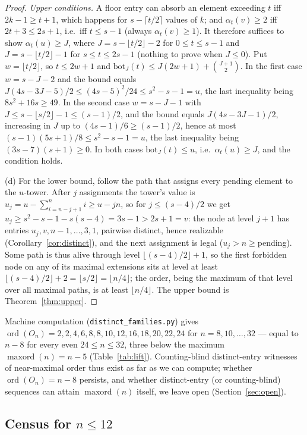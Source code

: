 \documentclass[11pt]{article}
\theoremstyle{definition}
\theoremstyle{remark}
\newcommand{\ord}{\operatorname{ord}}
\newcommand{\maxord}{\operatorname{maxord}}
\begin{document}
\begin{proof}
\emph{Upper conditions.} A floor entry can absorb an element exceeding $t$ iff
$2k-1\ge t+1$, which happens for $s-\lceil t/2\rceil$ values of $k$; and
$\alpha_t(v)\ge2$ iff $2t+3\le2s+1$, i.e.\ iff $t\le s-1$ (always
$\alpha_t(v)\ge1$). It therefore suffices to show $\alpha_t(u)\ge J$, where
$J=s-\lfloor t/2\rfloor-2$ for $0\le t\le s-1$ and $J=s-\lfloor t/2\rfloor-1$ for
$s\le t\le 2s-1$ (nothing to prove when $J\le0$). Put $w=\lfloor t/2\rfloor$, so
$t\le2w+1$ and $\mathrm{bot}_J(t)\le J(2w+1)+\binom{J+1}{2}$. In the first case
$w=s-J-2$ and the bound equals $J(4s-3J-5)/2\le(4s-5)^2/24\le s^2-s-1=u$, the last
inequality being $8s^2+16s\ge49$. In the second case $w=s-J-1$ with
$J\le s-\lfloor s/2\rfloor-1\le(s-1)/2$, and the bound equals $J(4s-3J-1)/2$,
increasing in $J$ up to $(4s-1)/6\ge(s-1)/2$, hence at most
$(s-1)(5s+1)/8\le s^2-s-1=u$, the last inequality being $(3s-7)(s+1)\ge0$. In both
cases $\mathrm{bot}_J(t)\le u$, i.e.\ $\alpha_t(u)\ge J$, and the condition holds.

(d) For the lower bound, follow the path that assigns every pending element to the
$u$-tower. After $j$ assignments the tower's value is
$u_j=u-\sum_{i=n-j+1}^{n}i\ge u-jn$, so for $j\le(s-4)/2$ we get
$u_j\ge s^2-s-1-s(s-4)=3s-1>2s+1=v$: the node at level $j+1$ has entries
$u_j,v,n-1,\dots,3,1$, pairwise distinct, hence realizable
(Corollary~\ref{cor:distinct}), and the next assignment is legal
($u_j>n\ge{}$pending). Some path is thus alive through level
$\lfloor(s-4)/2\rfloor+1$, so the first forbidden node on any of its maximal
extensions sits at level at least
$\lfloor(s-4)/2\rfloor+2=\lfloor s/2\rfloor=\lfloor n/4\rfloor$; the order,
being the maximum of that level over all maximal paths, is at least
$\lfloor n/4\rfloor$. The upper bound is Theorem~\ref{thm:upper}.
\end{proof}

Machine computation (\texttt{distinct\_families.py}) gives
$\ord(O_n)=2,2,4,6,8,8,10,12,16,18,20,22,24$ for $n=8,10,\dots,32$ --- equal to
$n-8$ for every even $24\le n\le32$, three below the maximum $\maxord(n)=n-5$
(Table~\ref{tab:lift}). Counting-blind distinct-entry witnesses of near-maximal
order thus exist as far as we can compute; whether $\ord(O_n)=n-8$ persists, and
whether distinct-entry (or counting-blind) sequences can attain $\maxord(n)$ itself,
we leave open (Section~\ref{sec:open}).

\subsection{Census for $n\le12$}\label{subsec:census}
\end{document}
